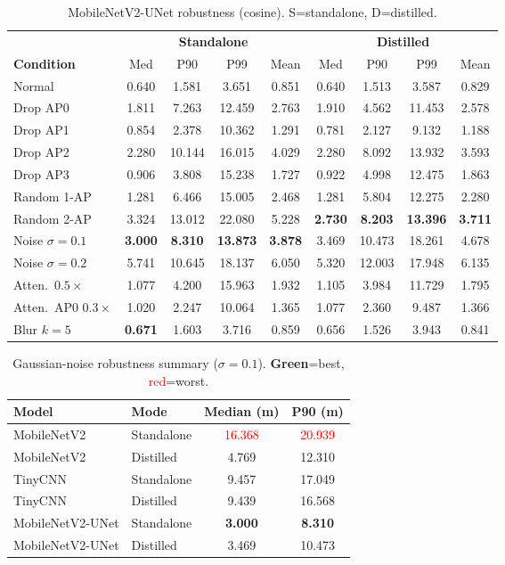 \documentclass[11pt,a4paper]{article}
\newcommand{\best}[1]{\textcolor{ours}{\textbf{#1}}}
\begin{document}
\begin{table}[H]
\centering
\caption{MobileNetV2-UNet robustness (cosine). S=standalone, D=distilled.}
\small
\begin{tabular}{@{}lcccc|cccc@{}}
\toprule
 & \multicolumn{4}{c|}{\textbf{Standalone}} & \multicolumn{4}{c}{\textbf{Distilled}} \\
\textbf{Condition} & Med & P90 & P99 & Mean & Med & P90 & P99 & Mean \\
\midrule
Normal              & 0.640 & 1.581 & 3.651 & 0.851 & 0.640 & 1.513 & 3.587 & 0.829 \\
Drop AP0            & 1.811 & 7.263 & 12.459& 2.763 & 1.910 & 4.562 & 11.453& 2.578 \\
Drop AP1            & 0.854 & 2.378 & 10.362& 1.291 & 0.781 & 2.127 & 9.132 & 1.188 \\
Drop AP2            & 2.280 & 10.144& 16.015& 4.029 & 2.280 & 8.092 & 13.932& 3.593 \\
Drop AP3            & 0.906 & 3.808 & 15.238& 1.727 & 0.922 & 4.998 & 12.475& 1.863 \\
Random 1-AP         & 1.281 & 6.466 & 15.005& 2.468 & 1.281 & 5.804 & 12.275& 2.280 \\
Random 2-AP         & 3.324 & 13.012& 22.080& 5.228 & \best{2.730}& \best{8.203}& \best{13.396}& \best{3.711} \\
Noise $\sigma{=}0.1$& \best{3.000}& \best{8.310}& \best{13.873}& \best{3.878}& 3.469 & 10.473& 18.261& 4.678 \\
Noise $\sigma{=}0.2$& 5.741 & 10.645& 18.137& 6.050 & 5.320 & 12.003& 17.948& 6.135 \\
Atten.\ $0.5\times$ & 1.077 & 4.200 & 15.963& 1.932 & 1.105 & 3.984 & 11.729& 1.795 \\
Atten.\ AP0 $0.3\times$& 1.020& 2.247& 10.064& 1.365 & 1.077 & 2.360 & 9.487 & 1.366 \\
Blur $k{=}5$        & \best{0.671}& 1.603 & 3.716 & 0.859 & 0.656 & 1.526 & 3.943 & 0.841 \\
\bottomrule
\end{tabular}
\end{table}

\begin{table}[H]
\centering
\caption{Gaussian-noise robustness summary ($\sigma=0.1$). \best{Green}=best, \textcolor{red}{red}=worst.}
\begin{tabular}{@{}llcc@{}}
\toprule
\textbf{Model} & \textbf{Mode} & \textbf{Median (m)} & \textbf{P90 (m)} \\
\midrule
MobileNetV2      & Standalone & \textcolor{red}{16.368} & \textcolor{red}{20.939} \\
MobileNetV2      & Distilled  & 4.769 & 12.310 \\
TinyCNN          & Standalone & 9.457 & 17.049 \\
TinyCNN          & Distilled  & 9.439 & 16.568 \\
MobileNetV2-UNet & Standalone & \best{3.000} & \best{8.310} \\
MobileNetV2-UNet & Distilled  & 3.469 & 10.473 \\
\bottomrule
\end{tabular}
\end{table}
\end{document}
